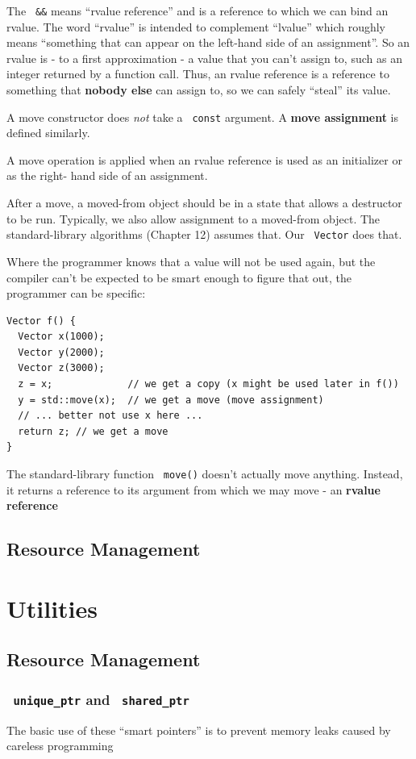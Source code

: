 \documentclass[11pt]{article}
\let\OldTexttt\texttt
\renewcommand{\texttt}[1]{\OldTexttt{\color{MidnightBlue} #1}}
\begin{document}
The \texttt{\&\&} means ``rvalue reference'' and is a reference to which we can bind an rvalue. The word
``rvalue'' is intended to complement ``lvalue'' which roughly means ``something that can appear on
the left-hand side of an assignment''. So an rvalue is - to a first approximation - a value that
you can't assign to, such as an integer returned by a function call. Thus, an rvalue reference
is a reference to something that \textbf{nobody else} can assign to, so we can safely ``steal'' its value.

A move constructor does \emph{not} take a \texttt{const} argument. A \textbf{move assignment} is defined similarly.

A move operation is applied when an rvalue reference is used as an initializer or as the right-
hand side of an assignment.

After a move, a moved-from object should be in a state that allows a destructor to be run.
Typically, we also allow assignment to a moved-from object. The standard-library algorithms
(Chapter 12) assumes that. Our \texttt{Vector} does that.

Where the programmer knows that a value will not be used again, but the compiler can’t be
expected to be smart enough to figure that out, the programmer can be specific:
\begin{verbatim}
Vector f() {
  Vector x(1000);
  Vector y(2000);
  Vector z(3000);
  z = x;             // we get a copy (x might be used later in f())
  y = std::move(x);  // we get a move (move assignment)
  // ... better not use x here ...
  return z; // we get a move
}
\end{verbatim}

The standard-library function \texttt{move()} doesn't actually move anything. Instead, it returns a
reference to its argument from which we may move - an \textbf{rvalue reference}
\subsection{Resource Management}
\label{sec:org72a34c0}

\section{Utilities}
\label{sec:orga30c21a}
\subsection{Resource Management}
\label{sec:org59f8248}
\subsubsection{\texttt{unique\_ptr} and \texttt{shared\_ptr}}
\label{sec:orgf1b4dff}
The basic use of these ``smart pointers''  is to prevent memory leaks caused by careless
programming
\end{document}
